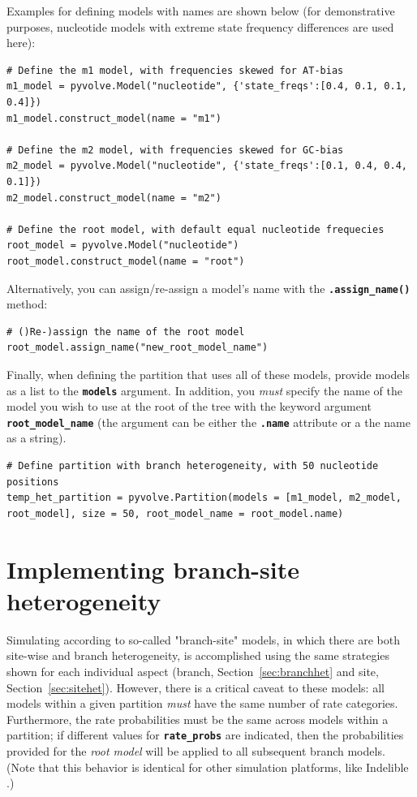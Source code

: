 \documentclass{article}
\newcommand{\code}[1]{\textbf{\texttt{\small{#1}}}}
\begin{document}
Examples for defining models with names are shown below (for demonstrative purposes, nucleotide models with extreme state frequency differences are used here):
\begin{lstlisting}
# Define the m1 model, with frequencies skewed for AT-bias
m1_model = pyvolve.Model("nucleotide", {'state_freqs':[0.4, 0.1, 0.1, 0.4]})
m1_model.construct_model(name = "m1")

# Define the m2 model, with frequencies skewed for GC-bias
m2_model = pyvolve.Model("nucleotide", {'state_freqs':[0.1, 0.4, 0.4, 0.1]})
m2_model.construct_model(name = "m2")

# Define the root model, with default equal nucleotide frequecies
root_model = pyvolve.Model("nucleotide")
root_model.construct_model(name = "root")
\end{lstlisting}

Alternatively, you can assign/re-assign a model's name with the \code{.assign\_name()} method:
\begin{lstlisting}
# ()Re-)assign the name of the root model
root_model.assign_name("new_root_model_name")
\end{lstlisting}



Finally, when defining the partition that uses all of these models, provide models as a list to the \code{models} argument. In addition, you \emph{must} specify the name of the model you wish to use at the root of the tree with the keyword argument \code{root\_model\_name} (the argument can be either the \code{.name} attribute or a the name as a string).
\begin{lstlisting}
# Define partition with branch heterogeneity, with 50 nucleotide positions
temp_het_partition = pyvolve.Partition(models = [m1_model, m2_model, root_model], size = 50, root_model_name = root_model.name) 
\end{lstlisting}



\section{Implementing branch-site heterogeneity}

Simulating according to so-called "branch-site" models, in which there are both site-wise and branch heterogeneity, is accomplished using the same strategies shown for each individual aspect (branch, Section~\ref{sec:branchhet} and site, Section~\ref{sec:sitehet}). However, there is a critical caveat to these models: all models within a given partition \emph{must} have the same number of rate categories. Furthermore, the rate probabilities must be the same across models within a partition; if different values for \code{rate\_probs} are indicated, then the probabilities provided for the \emph{root model} will be applied to all subsequent branch models. (Note that this behavior is identical for other simulation platforms, like Indelible \citep{Fletcher2009}.)
\end{document}
